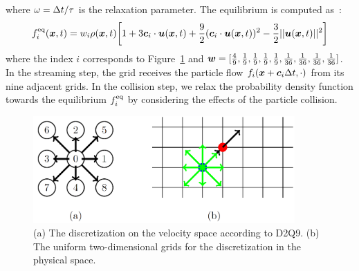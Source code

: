 where $\omega = \Delta t / \tau$ is the relaxation parameter.
The equilibrium is computed as~\cite{zhao2002non}:
\begin{equation}
\begin{aligned}
  f^{\rm eq}_i(\boldsymbol{x}, t) &=
  w_i \rho(\boldsymbol{x}, t) \biggl[
    1 + 3 \boldsymbol{c}_i \cdot \boldsymbol{u}(\boldsymbol{x}, t) +
    \frac{9}{2}(\boldsymbol{c}_i \cdot \boldsymbol{u}(\boldsymbol{x}, t))^2
    -\frac{3}{2} || \boldsymbol{u}(\boldsymbol{x}, t) ||^2
  \biggr] \\
\end{aligned}
\label{discretized-eq}
\end{equation}
where the index $i$ corresponds to Figure~\ref{fig:d2q9}
and $\boldsymbol{w} = [\frac{4}{9}, \frac{1}{9}, \frac{1}{9}, \frac{1}{9}, \frac{1}{9}, \frac{1}{36}, \frac{1}{36}, \frac{1}{36}, \frac{1}{36}]$.
In the streaming step, the grid receives 
the particle flow $f_i(\boldsymbol{x} + \boldsymbol{c}_i \Delta t, \cdot)$
from its nine adjacent grids.
In the collision step,
we relax the probability density function 
towards the equilibrium $f_i^{\rm eq}$
by considering the effects of the particle collision.

\begin{figure}[h!]
  \begin{center}
   \includegraphics[width=10cm]{logos/Gitter_LBM.png}
   \vspace{-3mm}
   \caption{
      (a) The discretization on the velocity space according to D2Q9.
      (b) The uniform two-dimensional grids for
      the discretization in the physical space.
   }
  \label{fig:d2q9}
  \end{center}
  \vspace{-3mm}
\end{figure}

